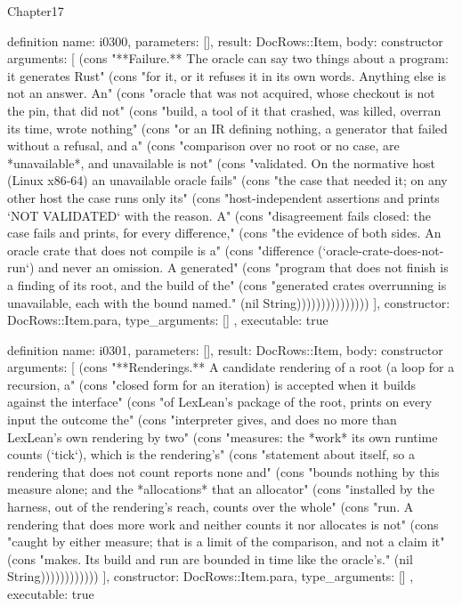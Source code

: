 \begin{lexlean}{Chapter17}
\begin{semanticmodule}
definition{
  name: i0300,
  parameters: [],
  result: DocRows::Item,
  body: constructor{
    arguments: [
      (cons "**Failure.** The oracle can say two things about a program: it generates Rust" (cons "for it, or it refuses it in its own words. Anything else is not an answer. An" (cons "oracle that was not acquired, whose checkout is not the pin, that did not" (cons "build, a tool of it that crashed, was killed, overran its time, wrote nothing" (cons "or an IR defining nothing, a generator that failed without a refusal, and a" (cons "comparison over no root or no case, are *unavailable*, and unavailable is not" (cons "validated. On the normative host (Linux x86-64) an unavailable oracle fails" (cons "the case that needed it; on any other host the case runs only its" (cons "host-independent assertions and prints `NOT VALIDATED` with the reason. A" (cons "disagreement fails closed: the case fails and prints, for every difference," (cons "the evidence of both sides. An oracle crate that does not compile is a" (cons "difference (`oracle-crate-does-not-run`) and never an omission. A generated" (cons "program that does not finish is a finding of its root, and the build of the" (cons "generated crates overrunning is unavailable, each with the bound named." (nil String)))))))))))))))
    ],
    constructor: DocRows::Item.para,
    type_arguments: []
  },
  executable: true
}

definition{
  name: i0301,
  parameters: [],
  result: DocRows::Item,
  body: constructor{
    arguments: [
      (cons "**Renderings.** A candidate rendering of a root (a loop for a recursion, a" (cons "closed form for an iteration) is accepted when it builds against the interface" (cons "of LexLean's package of the root, prints on every input the outcome the" (cons "interpreter gives, and does no more than LexLean's own rendering by two" (cons "measures: the *work* its own runtime counts (`tick`), which is the rendering's" (cons "statement about itself, so a rendering that does not count reports none and" (cons "bounds nothing by this measure alone; and the *allocations* that an allocator" (cons "installed by the harness, out of the rendering's reach, counts over the whole" (cons "run. A rendering that does more work and neither counts it nor allocates is not" (cons "caught by either measure; that is a limit of the comparison, and not a claim it" (cons "makes. Its build and run are bounded in time like the oracle's." (nil String))))))))))))
    ],
    constructor: DocRows::Item.para,
    type_arguments: []
  },
  executable: true
}


\end{semanticmodule}
\end{lexlean}
